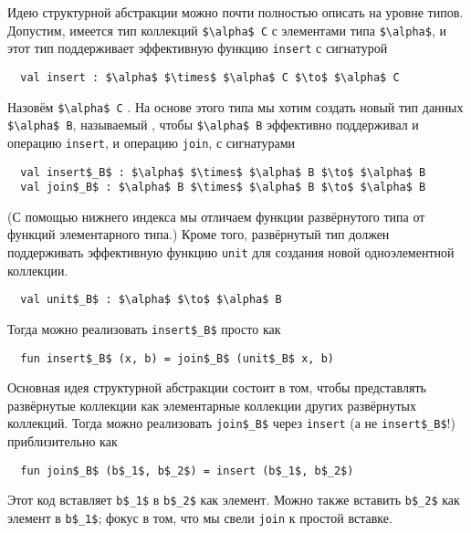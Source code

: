 Идею структурной абстракции можно почти полностью описать на уровне
типов. Допустим, имеется тип коллекций \lstinline!$\alpha$ C! с
элементами типа \lstinline!$\alpha$!, и этот тип поддерживает
эффективную функцию \lstinline!insert! с сигнатурой
\begin{lstlisting}
  val insert : $\alpha$ $\times$ $\alpha$ C $\to$ $\alpha$ C
\end{lstlisting}
Назовём \lstinline!$\alpha$ C!
.
На основе этого типа мы
хотим создать новый тип данных
\lstinline!$\alpha$ B!, называемый , чтобы \lstinline!$\alpha$ B!
эффективно поддерживал и операцию \lstinline!insert!, и операцию
\lstinline!join!, с сигнатурами
\begin{lstlisting}
  val insert$_B$ : $\alpha$ $\times$ $\alpha$ B $\to$ $\alpha$ B
  val join$_B$ : $\alpha$ B $\times$ $\alpha$ B $\to$ $\alpha$ B
\end{lstlisting}
(С помощью нижнего индекса мы отличаем функции развёрнутого типа от
функций элементарного типа.) Кроме того, развёрнутый тип должен
поддерживать эффективную функцию \lstinline!unit! для создания новой
одноэлементной коллекции.
\begin{lstlisting}
  val unit$_B$ : $\alpha$ $\to$ $\alpha$ B
\end{lstlisting}
Тогда можно реализовать \lstinline!insert$_B$! просто как
\begin{lstlisting}
  fun insert$_B$ (x, b) = join$_B$ (unit$_B$ x, b)
\end{lstlisting}
Основная идея структурной абстракции состоит в том, чтобы представлять
развёрнутые коллекции как элементарные коллекции других развёрнутых
коллекций. Тогда можно реализовать \lstinline!join$_B$! через
\lstinline!insert! (а не \lstinline!insert$_B$!!) приблизительно как
\begin{lstlisting}
  fun join$_B$ (b$_1$, b$_2$) = insert (b$_1$, b$_2$)
\end{lstlisting}
Этот код вставляет \lstinline!b$_1$! в \lstinline!b$_2$! как
элемент. Можно также вставить \lstinline!b$_2$! как элемент в
\lstinline!b$_1$!; фокус в том, что мы свели \lstinline!join! к
простой вставке.

